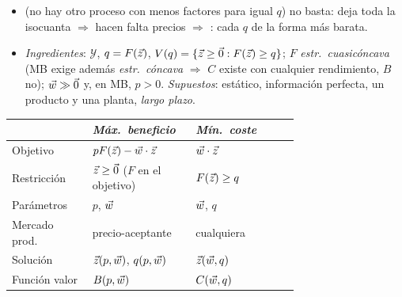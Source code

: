 \documentclass{article}
\begin{document}
\begin{columnas}
\begin{itemize}
\item {} (no hay otro proceso con menos factores para igual $q$) no basta: deja toda la isocuanta $\Rightarrow$ hacen falta precios $\Rightarrow$ : cada $q$ de la forma más barata.
\item \emph{Ingredientes}: $\mathcal{Y}$, $q=F(\vec{z})$, $V(q)=\{\vec{z}\geq\vec{0}:F(\vec{z})\geq q\}$; $F$ \emph{estr.\ cuasicóncava} (MB exige además \emph{estr.\ cóncava} $\Rightarrow$ $C$ existe con cualquier rendimiento, $B$ no); $\vec{w}\gg\vec{0}$ y, en MB, $p>0$. \emph{Supuestos}: estático, información perfecta, un producto y una planta, \emph{largo plazo}.
\end{itemize}
{\centering\small\renewcommand{\arraystretch}{1.15}\setlength{\tabcolsep}{3pt}%
\begin{tabular}{@{}l>{\raggedright\arraybackslash}p{0.36\linewidth}>{\raggedright\arraybackslash}p{0.36\linewidth}@{}}
\toprule
 & \textit{Máx.\ beneficio} & \textit{Mín.\ coste}\\
\midrule
Objetivo & $pF(\vec{z})-\vec{w}\cdot\vec{z}$ & $\vec{w}\cdot\vec{z}$\\
Restricción & $\vec{z}\geq\vec{0}$ ($F$ en el objetivo) & $F(\vec{z})\geq q$\\
Parámetros & $p$, $\vec{w}$ & $\vec{w}$, $q$\\
Mercado prod. & precio-aceptante & cualquiera\\
Solución & $\vec{z}(p,\vec{w})$, $q(p,\vec{w})$ & $\vec{z}(\vec{w},q)$\\
Función valor & $B(p,\vec{w})$ & $C(\vec{w},q)$\\
\bottomrule
\end{tabular}\par}


\end{columnas}
\end{document}
